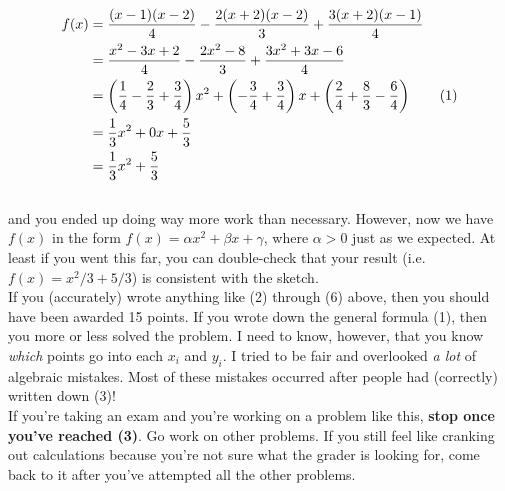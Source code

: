 \documentclass{article}
\newcommand\numberthis{\addtocounter{equation}{1}\tag{\theequation}}
\def\a{\alpha}
\def\b{\beta}
\def\c{\gamma}
\begin{document}
\begin{align*}
f(x)  &=  \frac{(x - 1)(x - 2)}{4} -  \frac{2(x + 2)(x - 2)}{3} + \frac{3(x + 2)(x - 1)}{4} \\
&= \frac{x^2 - 3 x +2}{4} - \frac{2x^2  - 8}{3} + \frac{3 x^2 + 3 x - 6}{4} \\
&= \left( \frac{1}{4} - \frac{2}{3} + \frac{3}{4} \right) x^2 + \left( -\frac{3}{4} + \frac{3}{4} \right) x + \left( \frac{2}{4} + \frac{8}{3} - \frac{6}{4} \right) \numberthis \\
&= \frac{1}{3} x^2 + 0 x + \frac{5}{3} \\
&= \frac{1}{3} x^2 + \frac{5}{3} 
\end{align*}\\

{\setlength{\parindent}{0cm}
and you ended up doing way more work than necessary. However, now we have $f(x)$ in the form $f(x) = \a x^2 + \b x + \c$, where $\a > 0$ just as we expected. At least if you went this far, you can double-check that your result (i.e. $f(x) = x^2 / 3 + 5 / 3$) is consistent with the sketch. }\\

If you (accurately) wrote anything like (2) through (6) above, then you should have been awarded 15 points. If you wrote down the general formula (1), then you more or less solved the problem. I need to know, however, that you know \textit{which} points go into each $x_i$ and $y_i$. I tried to be fair and overlooked \textit{a lot} of algebraic mistakes. Most of these mistakes occurred after people had (correctly) written down (3)! \\

If you're taking an exam and you're working on a problem like this, \textbf{stop once you've reached (3)}. Go work on other problems. If you still feel like cranking out calculations because you're not sure what the grader is looking for, come back to it after you've attempted all the other problems. 
\end{document}
